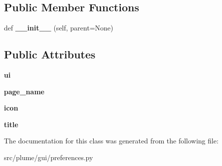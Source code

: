 \subsection*{Public Member Functions}
\begin{DoxyCompactItemize}
\item 
def {\bfseries \+\_\+\+\_\+init\+\_\+\+\_\+} (self, parent=None)\hypertarget{classplume-creator_1_1src_1_1plume_1_1gui_1_1preferences_1_1_plugins_preferences_aac9e520cd9fb0ad9322ee3d5b6a5478b}{}\label{classplume-creator_1_1src_1_1plume_1_1gui_1_1preferences_1_1_plugins_preferences_aac9e520cd9fb0ad9322ee3d5b6a5478b}

\end{DoxyCompactItemize}
\subsection*{Public Attributes}
\begin{DoxyCompactItemize}
\item 
{\bfseries ui}\hypertarget{classplume-creator_1_1src_1_1plume_1_1gui_1_1preferences_1_1_plugins_preferences_aa0aec762c7eca68ba21e40e145985f4e}{}\label{classplume-creator_1_1src_1_1plume_1_1gui_1_1preferences_1_1_plugins_preferences_aa0aec762c7eca68ba21e40e145985f4e}

\item 
{\bfseries page\+\_\+name}\hypertarget{classplume-creator_1_1src_1_1plume_1_1gui_1_1preferences_1_1_plugins_preferences_ac25c97ad2476414511c4f83375ff81ee}{}\label{classplume-creator_1_1src_1_1plume_1_1gui_1_1preferences_1_1_plugins_preferences_ac25c97ad2476414511c4f83375ff81ee}

\item 
{\bfseries icon}\hypertarget{classplume-creator_1_1src_1_1plume_1_1gui_1_1preferences_1_1_plugins_preferences_a53cca2f560cbce00ea86c67cc2d90e59}{}\label{classplume-creator_1_1src_1_1plume_1_1gui_1_1preferences_1_1_plugins_preferences_a53cca2f560cbce00ea86c67cc2d90e59}

\item 
{\bfseries title}\hypertarget{classplume-creator_1_1src_1_1plume_1_1gui_1_1preferences_1_1_plugins_preferences_a35fd49a944a469e605d134e981ff0a61}{}\label{classplume-creator_1_1src_1_1plume_1_1gui_1_1preferences_1_1_plugins_preferences_a35fd49a944a469e605d134e981ff0a61}

\end{DoxyCompactItemize}


The documentation for this class was generated from the following file\+:\begin{DoxyCompactItemize}
\item 
src/plume/gui/preferences.\+py\end{DoxyCompactItemize}
